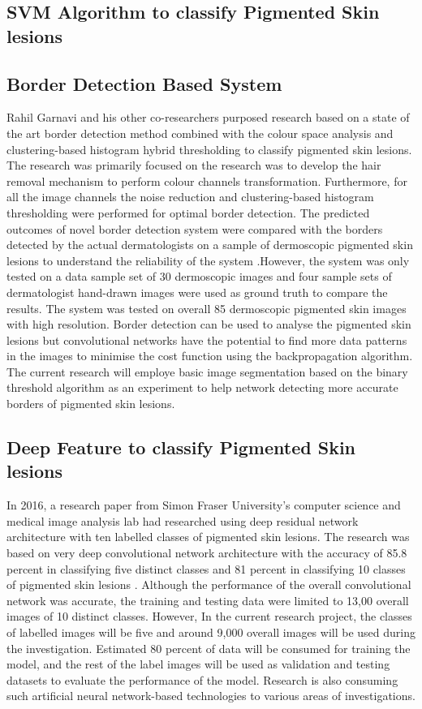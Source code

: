 \subsection{SVM Algorithm to classify Pigmented Skin lesions}

\subsection{Border Detection Based System}
Rahil Garnavi and his other co-researchers purposed research based on a state of the art border detection method combined with the colour space analysis and clustering-based histogram hybrid thresholding 
to classify pigmented skin lesions. The research was primarily focused on the research was to develop the hair removal mechanism to perform colour channels transformation. Furthermore, for all the image channels the noise reduction 
and clustering-based histogram thresholding were performed for optimal border detection. The predicted outcomes of novel border detection system were compared with the 
borders detected by the actual dermatologists on a sample of 
dermoscopic pigmented skin lesions to understand the reliability of the 
system \citep{GARNAVI2011105}.However, the system was only tested on a data sample set of 
30 dermoscopic images and four sample sets of dermatologist hand-drawn images were used as ground
truth to compare the results. The system was tested on overall 85 dermoscopic pigmented skin images 
with high resolution. Border detection can be used to analyse the pigmented skin lesions but 
convolutional networks have the potential to find more data patterns in the images to minimise 
the cost function using the backpropagation algorithm. The current research will employe basic image
segmentation based on the binary threshold algorithm as an experiment to help network detecting more accurate
borders of pigmented skin lesions.

\subsection{Deep Feature to classify Pigmented Skin lesions}
In 2016, a research paper from Simon Fraser University’s computer science and medical image analysis lab had researched using 
deep residual network architecture with ten labelled 
classes of pigmented skin lesions. The research was based on very 
deep convolutional network architecture with the accuracy 
of 85.8 percent in classifying five distinct classes and
81 percent in classifying 10 classes of pigmented skin lesions
\citep{7493528}. Although the performance of the overall convolutional network was accurate, the training and testing data were limited to 13,00 overall images of 10 distinct classes.
However, In the current research project, the classes of labelled images will be five and around 9,000 overall images will be used during the investigation.
Estimated 80 percent of data will be consumed for training the model, and the rest of the label images will be used as validation and testing datasets 
to evaluate the performance of the model. Research is also consuming such artificial neural network-based technologies to various areas of investigations.
\pagebreak